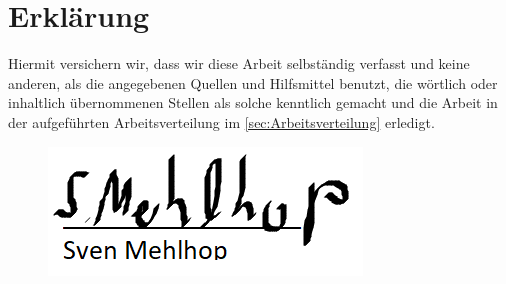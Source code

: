 \section{Erklärung}

Hiermit versichern wir, dass wir diese Arbeit selbständig verfasst und keine anderen, als die angegebenen Quellen und Hilfsmittel benutzt, die wörtlich oder inhaltlich übernommenen Stellen als solche kenntlich gemacht und die Arbeit in der aufgeführten Arbeitsverteilung im \autoref{sec:Arbeitsverteilung} erledigt. \\[2ex] 

\noindent
\begin{figure}[H]
	\includegraphics{Anhang/Unterschriften.png}%
\end{figure}

